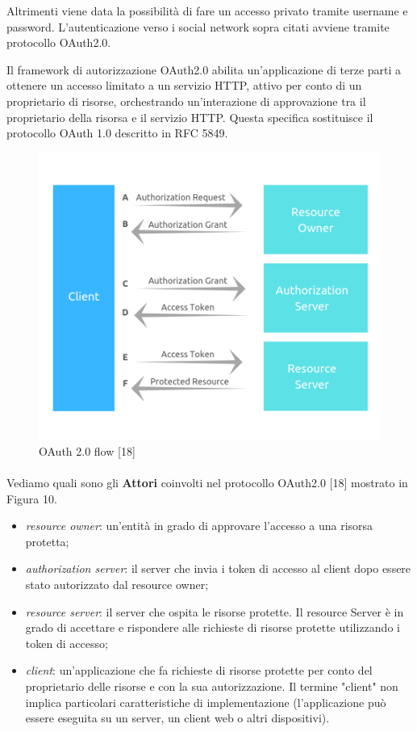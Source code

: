 Altrimenti viene data la possibilità di fare un accesso privato tramite username e password.
L'autenticazione verso i social network sopra citati avviene tramite protocollo OAuth2.0.

Il framework di autorizzazione OAuth2.0 abilita un'applicazione di terze parti a ottenere un accesso limitato a un servizio HTTP, attivo
per conto di un proprietario di risorse, orchestrando un'interazione di approvazione tra il proprietario della risorsa e il servizio HTTP.
Questa specifica sostituisce il protocollo OAuth 1.0 descritto in RFC 5849.

\begin{figure}[h!]
    \centering  
    \caption{OAuth 2.0 flow [18]}
    \includegraphics[scale=0.60]{img/cap2/oauth20-2}
\end{figure}

\paragraph{}

Vediamo quali sono gli \textbf{Attori} coinvolti nel protocollo OAuth2.0 [18] mostrato in Figura 10.

\begin{itemize}
\item \textit{resource owner}: un'entità in grado di approvare l'accesso a una risorsa protetta;
\item \textit{authorization server}: il server che invia i token di accesso al client dopo essere stato autorizzato
dal resource owner;
\item \textit{resource server}: il server che ospita le risorse protette. Il resource Server è in grado di accettare
e rispondere alle richieste di risorse protette utilizzando i token di accesso;
\item \textit{client}: un'applicazione che fa richieste di risorse protette per conto del
proprietario delle risorse e con la sua autorizzazione. Il termine "client"
non implica particolari caratteristiche di implementazione (l'applicazione può essere eseguita
su un server, un client web o altri dispositivi).
\end{itemize}


